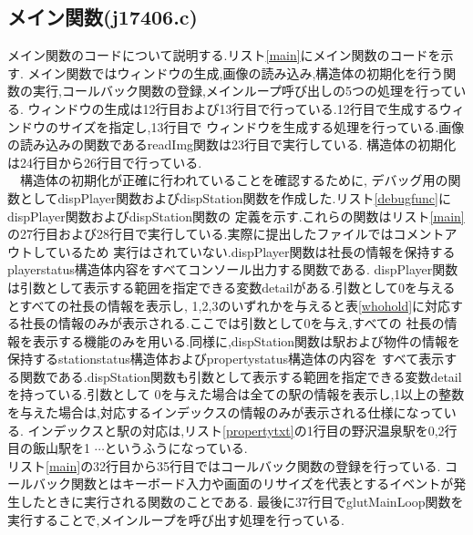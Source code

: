 \documentclass[a4j]{jarticle}
\begin{document}
  \subsection{メイン関数(j17406.c)}
メイン関数のコードについて説明する.リスト\ref{main}にメイン関数のコードを示す.
メイン関数ではウィンドウの生成,画像の読み込み,構造体の初期化を行う関数の実行,コールバック関数の登録,メインループ呼び出しの5つの処理を行っている.
ウィンドウの生成は12行目および13行目で行っている.12行目で生成するウィンドウのサイズを指定し,13行目で
ウィンドウを生成する処理を行っている.画像の読み込みの関数であるreadImg関数は23行目で実行している.
構造体の初期化は24行目から26行目で行っている.\\
　構造体の初期化が正確に行われていることを確認するために,
デバッグ用の関数としてdispPlayer関数およびdispStation関数を作成した.リスト\ref{debugfunc}にdispPlayer関数およびdispStation関数の
定義を示す.これらの関数はリスト\ref{main}の27行目および28行目で実行している.実際に提出したファイルではコメントアウトしているため
実行はされていない.dispPlayer関数は社長の情報を保持するplayerstatus構造体内容をすべてコンソール出力する関数である.
dispPlayer関数は引数として表示する範囲を指定できる変数detailがある.引数として0を与えるとすべての社長の情報を表示し,
1,2,3のいずれかを与えると表\ref{whohold}に対応する社長の情報のみが表示される.ここでは引数として0を与え,すべての
社長の情報を表示する機能のみを用いる.同様に,dispStation関数は駅および物件の情報を保持するstationstatus構造体およびpropertystatus構造体の内容を
すべて表示する関数である.dispStation関数も引数として表示する範囲を指定できる変数detailを持っている.引数として
0を与えた場合は全ての駅の情報を表示し,1以上の整数を与えた場合は,対応するインデックスの情報のみが表示される仕様になっている.
インデックスと駅の対応は,リスト\ref{propertytxt}の1行目の野沢温泉駅を0,2行目の飯山駅を1 $\cdots$というふうになっている.\\
リスト\ref{main}の32行目から35行目ではコールバック関数の登録を行っている.
コールバック関数とはキーボード入力や画面のリサイズを代表とするイベントが発生したときに実行される関数のことである. 
最後に37行目でglutMainLoop関数を実行することで,メインループを呼び出す処理を行っている.
\end{document}
